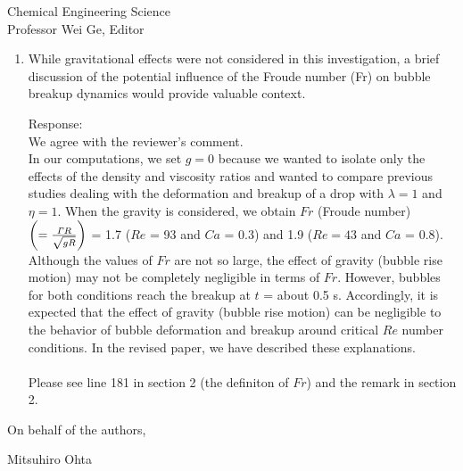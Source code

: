 \documentclass{letter}
\begin{document}
\begin{letter}{
Chemical Engineering Science\\
Professor Wei Ge, Editor\\}
\begin{enumerate}
Response: \\
In the paper, we already described physical properties (density, viscosity, surface tension) set in the computations:\\
\\
Bubble: $\rho_{\rm b}$ = 1.2 kg/m$^{3}$ and $\mu_{\rm b} = 1.8 \times 10^{-5} $ Pa$\cdot$s\\
Liquid:  $\rho_{\rm m}$ = 1000 kg/m$^{3}$ and $\mu_{\rm m}$ = a changeable value corresponding to $Ca$ [Pa$\cdot$s]\\
Surface tension : $\sigma =2.5 \times 10^{-2}$ N/m. \\
Then, $\mu_{\rm m}$ had $2.0 \times 10^{-2} \sim 6.0 \times 10^{-2}$ Pa$\cdot$s and
$V$ had about 1.1 $\sim$ 1.3 m/s for the range of $Ca$ and $Re$ in our computaions.\\
When $\mu_{\rm m}$ = $2.0 \times 10^{-2} \sim 6.0 \times 10^{-2}$ Pa$\cdot$s, we have $\eta < 1.0 \times 10^{-3}$.\\
We have added the range of $\mu_{\rm m}$ and $V$ used in this study.\\
\\

\par\noindent
\item
\textsf
{While gravitational effects were not considered in this investigation, a brief discussion of the potential influence 
of the Froude number (Fr) on bubble breakup dynamics would provide valuable context.}
\vspace{3 mm}

Response: \\
We agree with the reviewer's comment.  \\
In our computations, we set $g = 0$ because we wanted to isolate only the effects of the density and viscosity ratios and 
wanted to compare previous studies dealing with the deformation and breakup of a drop with $\lambda =1$ and $\eta = 1$.
When the gravity is considered, we obtain $Fr$ (Froude number) $\left(= \frac{{\it \Gamma}R}{\sqrt {gR}} \right)$ = 1.7 ($Re$ = 93 and $Ca$ = 0.3) 
and 1.9 ($Re = 43$ and $Ca$ = 0.8). \\
Although the values of $Fr$ are not so large, the effect of gravity (bubble rise motion) may not be completely negligible in terms of $Fr$.
However, bubbles for both conditions reach the breakup at $t$ = about 0.5 s. 
Accordingly, it is expected that the effect of gravity (bubble rise motion) can be negligible to the behavior of bubble deformation and breakup 
around critical $Re$ number conditions.
In the revised paper, we have described these explanations.\\
\\
Please see line 181 in section 2 (the definiton of $Fr$) and the remark in section 2.
\\


\end{enumerate}

\closing{On behalf of the authors,}
Mitsuhiro Ohta

\end{letter}
\end{document}
